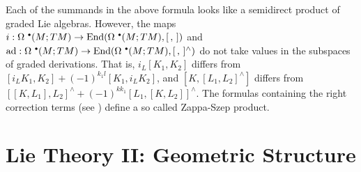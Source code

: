 \begin{rem}
    Each of the summands in the above formula looks like a semidirect product of graded Lie algebras. However, the maps $i:\Omega^{\smbullet}(M;TM)\to \End(\Omega^{\smbullet}(M;TM),[\,,\,])$ and $\ad:\Omega^{\smbullet}(M;TM)\to \End(\Omega^{\smbullet}(M;TM),[\,,\,]^{\wedge})$ do not take values in the subspaces of graded derivations. That is, $i_L[K_1,K_2]$ differs from $[i_LK_1,K_2]+(-1)^{k_1l}[K_1,i_LK_2]$, and $[K,[L_1,L_2]^{\wedge}]$ differs from $[[K,L_1],L_2]^{\wedge}+(-1)^{kk_1}[L_1,[K,L_2]]^{\wedge}$. The formulas containing the right correction terms (see \cite[8.11]{Kolar}) define a so called Zappa-Szep product.
\end{rem}













\clearpage
\section{Lie Theory II: Geometric Structure}\label{sec: Lie theory ii}

